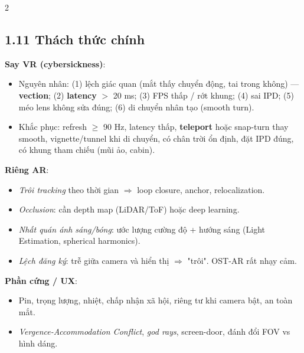 \begin{paracol}{2}
\subsection*{1.11 Thách thức chính}
\textbf{Say VR (cybersickness)}:
\begin{itemize}[leftmargin=*,nosep]
  \item Nguyên nhân: (1) lệch giác quan (mắt thấy chuyển động, tai trong không) — \textbf{vection}; (2) \textbf{latency} $>$ 20 ms; (3) FPS thấp / rớt khung; (4) sai IPD; (5) méo lens không sửa đúng; (6) di chuyển nhân tạo (smooth turn).
  \item Khắc phục: refresh $\geq$ 90 Hz, latency thấp, \textbf{teleport} hoặc snap-turn thay smooth, vignette/tunnel khi di chuyển, có chân trời ổn định, đặt IPD đúng, có khung tham chiếu (mũi ảo, cabin).
\end{itemize}
\textbf{Riêng AR}:
\begin{itemize}[leftmargin=*,nosep]
  \item \emph{Trôi tracking} theo thời gian $\Rightarrow$ loop closure, anchor, relocalization.
  \item \emph{Occlusion}: cần depth map (LiDAR/ToF) hoặc deep learning.
  \item \emph{Nhất quán ánh sáng/bóng}: ước lượng cường độ + hướng sáng (Light Estimation, spherical harmonics).
  \item \emph{Lệch đăng ký}: trễ giữa camera và hiển thị $\Rightarrow$ "trôi". OST-AR rất nhạy cảm.
\end{itemize}
\textbf{Phần cứng / UX}:
\begin{itemize}[leftmargin=*,nosep]
  \item Pin, trọng lượng, nhiệt, chấp nhận xã hội, riêng tư khi camera bật, an toàn mắt.
  \item \emph{Vergence-Accommodation Conflict}, \emph{god rays}, screen-door, đánh đổi FOV vs hình dáng.
\end{itemize}

\switchcolumn*


\end{paracol}
